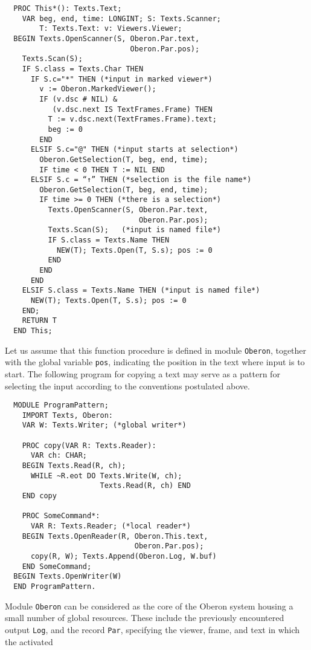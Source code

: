 \begin{verbatim}
  PROC This*(): Texts.Text;
    VAR beg, end, time: LONGINT; S: Texts.Scanner;
        T: Texts.Text: v: Viewers.Viewer;
  BEGIN Texts.OpenScanner(S, Oberon.Par.text,
                             Oberon.Par.pos);
    Texts.Scan(S);
    IF S.class = Texts.Char THEN
      IF S.c="*" THEN (*input in marked viewer*)
        v := Oberon.MarkedViewer();
        IF (v.dsc # NIL) &
           (v.dsc.next IS TextFrames.Frame) THEN
          T := v.dsc.next(TextFrames.Frame).text;
          beg := 0
        END
      ELSIF S.c="@" THEN (*input starts at selection*)
        Oberon.GetSelection(T, beg, end, time);
        IF time < 0 THEN T := NIL END
      ELSIF S.c = “↑” THEN (*selection is the file name*)
        Oberon.GetSelection(T, beg, end, time);
        IF time >= 0 THEN (*there is a selection*)
          Texts.OpenScanner(S, Oberon.Par.text,
                               Oberon.Par.pos);
          Texts.Scan(S);   (*input is named file*)
          IF S.class = Texts.Name THEN
            NEW(T); Texts.Open(T, S.s); pos := 0
          END
        END
      END
    ELSIF S.class = Texts.Name THEN (*input is named file*)
      NEW(T); Texts.Open(T, S.s); pos := 0
    END;
    RETURN T
  END This;
\end{verbatim}
Let us assume that this function procedure is defined in module \verb|Oberon|, together
with the global variable \verb|pos|, indicating the position in the text where input is
to start. The following program for copying a text may serve as a pattern for selecting
the input according to the conventions postulated above.
\begin{verbatim}
  MODULE ProgramPattern;
    IMPORT Texts, Oberon:
    VAR W: Texts.Writer; (*global writer*)
 
    PROC copy(VAR R: Texts.Reader):
      VAR ch: CHAR;
    BEGIN Texts.Read(R, ch);
      WHILE ~R.eot DO Texts.Write(W, ch);
                      Texts.Read(R, ch) END
    END copy
 
    PROC SomeCommand*:
      VAR R: Texts.Reader; (*local reader*)
    BEGIN Texts.OpenReader(R, Oberon.This.text,
                              Oberon.Par.pos);
      copy(R, W); Texts.Append(Oberon.Log, W.buf)
    END SomeCommand;
  BEGIN Texts.OpenWriter(W)
  END ProgramPattern.
\end{verbatim}
Module \verb|Oberon| can be considered as the core of the Oberon system housing a small
number of global resources. These include the previously encountered output \verb|Log|,
and the record \verb|Par|, specifying the viewer, frame, and text in which the activated
